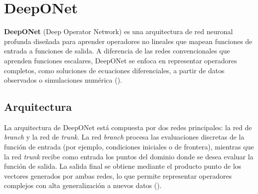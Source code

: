 \documentclass[
  spanish,
  us-letterpaper,
  DIV=11,
  numbers=noendperiod]{scrreprt}
\theoremstyle{definition}
\theoremstyle{plain}
\theoremstyle{remark}
\begin{document}
\chapter{DeepONet}\label{deeponet}

\textbf{DeepONet} (Deep Operator Network) es una arquitectura de red
neuronal profunda diseñada para aprender operadores no lineales que
mapean funciones de entrada a funciones de salida. A diferencia de las
redes convencionales que aprenden funciones escalares, DeepONet se
enfoca en representar operadores completos, como soluciones de
ecuaciones diferenciales, a partir de datos observados o simulaciones
numérica ().

\section{Arquitectura}\label{arquitectura}

La arquitectura de DeepONet está compuesta por dos redes principales: la
red de \emph{branch} y la red de \emph{trunk}. La red \emph{branch}
procesa las evaluaciones discretas de la función de entrada (por
ejemplo, condiciones iniciales o de frontera), mientras que la red
\emph{trunk} recibe como entrada los puntos del dominio donde se desea
evaluar la función de salida. La salida final se obtiene mediante el
producto punto de los vectores generados por ambas redes, lo que permite
representar operadores complejos con alta generalización a nuevos datos
().
\end{document}
